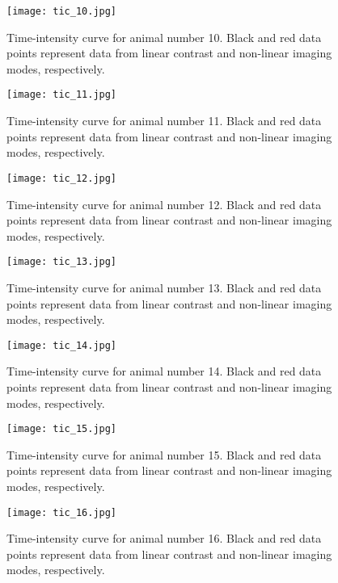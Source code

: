 \begin{figure}
	\texttt{[image: tic\_10.jpg]}
	\caption{Time-intensity curve for animal number 10. Black and red data points represent data from linear contrast and non-linear imaging modes, respectively.}
\end{figure}
\begin{figure}
	\texttt{[image: tic\_11.jpg]}
	\caption{Time-intensity curve for animal number 11. Black and red data points represent data from linear contrast and non-linear imaging modes, respectively.}
\end{figure}
\begin{figure}
	\texttt{[image: tic\_12.jpg]}
	\caption{Time-intensity curve for animal number 12. Black and red data points represent data from linear contrast and non-linear imaging modes, respectively.}
\end{figure}\begin{figure}
	\texttt{[image: tic\_13.jpg]}
	\caption{Time-intensity curve for animal number 13. Black and red data points represent data from linear contrast and non-linear imaging modes, respectively.}
\end{figure}
\begin{figure}
	\texttt{[image: tic\_14.jpg]}
	\caption{Time-intensity curve for animal number 14. Black and red data points represent data from linear contrast and non-linear imaging modes, respectively.}
\end{figure}
\begin{figure}
	\texttt{[image: tic\_15.jpg]}
	\caption{Time-intensity curve for animal number 15. Black and red data points represent data from linear contrast and non-linear imaging modes, respectively.}
\end{figure}
\begin{figure}
	\texttt{[image: tic\_16.jpg]}
	\caption{Time-intensity curve for animal number 16. Black and red data points represent data from linear contrast and non-linear imaging modes, respectively.}
\end{figure}
\clearpage